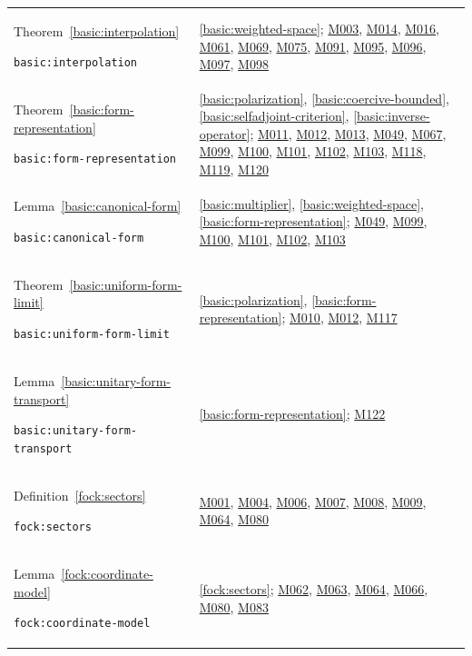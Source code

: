 \documentclass[11pt,a4paper]{article}
\theoremstyle{definition}
\theoremstyle{remark}
\begin{document}
\begin{longtable}{@{}p{}p{}@{}}
Theorem~\ref{basic:interpolation}\par\nolinkurl{basic:interpolation} & \ref{basic:weighted-space}; \hyperref[base:M003]{M003}, \hyperref[base:M014]{M014}, \hyperref[base:M016]{M016}, \hyperref[base:M061]{M061}, \hyperref[base:M069]{M069}, \hyperref[base:M075]{M075}, \hyperref[base:M091]{M091}, \hyperref[base:M095]{M095}, \hyperref[base:M096]{M096}, \hyperref[base:M097]{M097}, \hyperref[base:M098]{M098} \\[4pt]
Theorem~\ref{basic:form-representation}\par\nolinkurl{basic:form-representation} & \ref{basic:polarization}, \ref{basic:coercive-bounded}, \ref{basic:selfadjoint-criterion}, \ref{basic:inverse-operator}; \hyperref[base:M011]{M011}, \hyperref[base:M012]{M012}, \hyperref[base:M013]{M013}, \hyperref[base:M049]{M049}, \hyperref[base:M067]{M067}, \hyperref[base:M099]{M099}, \hyperref[base:M100]{M100}, \hyperref[base:M101]{M101}, \hyperref[base:M102]{M102}, \hyperref[base:M103]{M103}, \hyperref[base:M118]{M118}, \hyperref[base:M119]{M119}, \hyperref[base:M120]{M120} \\[4pt]
Lemma~\ref{basic:canonical-form}\par\nolinkurl{basic:canonical-form} & \ref{basic:multiplier}, \ref{basic:weighted-space}, \ref{basic:form-representation}; \hyperref[base:M049]{M049}, \hyperref[base:M099]{M099}, \hyperref[base:M100]{M100}, \hyperref[base:M101]{M101}, \hyperref[base:M102]{M102}, \hyperref[base:M103]{M103} \\[4pt]
Theorem~\ref{basic:uniform-form-limit}\par\nolinkurl{basic:uniform-form-limit} & \ref{basic:polarization}, \ref{basic:form-representation}; \hyperref[base:M010]{M010}, \hyperref[base:M012]{M012}, \hyperref[base:M117]{M117} \\[4pt]
Lemma~\ref{basic:unitary-form-transport}\par\nolinkurl{basic:unitary-form-transport} & \ref{basic:form-representation}; \hyperref[base:M122]{M122} \\[4pt]
Definition~\ref{fock:sectors}\par\nolinkurl{fock:sectors} & \hyperref[base:M001]{M001}, \hyperref[base:M004]{M004}, \hyperref[base:M006]{M006}, \hyperref[base:M007]{M007}, \hyperref[base:M008]{M008}, \hyperref[base:M009]{M009}, \hyperref[base:M064]{M064}, \hyperref[base:M080]{M080} \\[4pt]
Lemma~\ref{fock:coordinate-model}\par\nolinkurl{fock:coordinate-model} & \ref{fock:sectors}; \hyperref[base:M062]{M062}, \hyperref[base:M063]{M063}, \hyperref[base:M064]{M064}, \hyperref[base:M066]{M066}, \hyperref[base:M080]{M080}, \hyperref[base:M083]{M083} \\[4pt]

\end{longtable}
\end{document}
